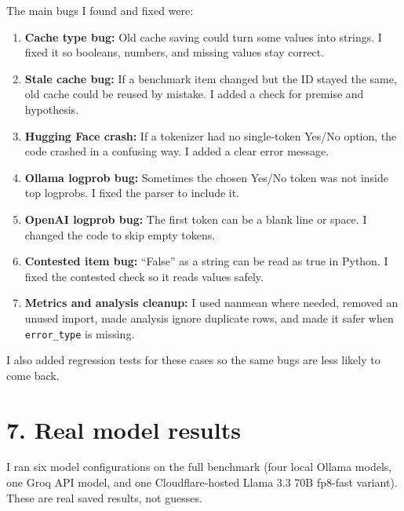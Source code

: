 \documentclass[11pt, a4paper]{article}
\begin{document}
The main bugs I found and fixed were:
\begin{enumerate}[leftmargin=*]
    \item \textbf{Cache type bug:} Old cache saving could turn some values into strings. I fixed it so booleans, numbers, and missing values stay correct.
    \item \textbf{Stale cache bug:} If a benchmark item changed but the ID stayed the same, old cache could be reused by mistake. I added a check for premise and hypothesis.
    \item \textbf{Hugging Face crash:} If a tokenizer had no single-token Yes/No option, the code crashed in a confusing way. I added a clear error message.
    \item \textbf{Ollama logprob bug:} Sometimes the chosen Yes/No token was not inside top logprobs. I fixed the parser to include it.
    \item \textbf{OpenAI logprob bug:} The first token can be a blank line or space. I changed the code to skip empty tokens.
    \item \textbf{Contested item bug:} ``False'' as a string can be read as true in Python. I fixed the contested check so it reads values safely.
    \item \textbf{Metrics and analysis cleanup:} I used nanmean where needed, removed an unused import, made analysis ignore duplicate rows, and made it safer when \texttt{error\_type} is missing.
\end{enumerate}
I also added regression tests for these cases so the same bugs are less likely to come back.

\FloatBarrier
{}
\section*{\color{bambergnavy} 7. Real model results}
I ran six model configurations on the full benchmark (four local Ollama models, one Groq API model, and one Cloudflare-hosted Llama 3.3 70B fp8-fast variant). These are real saved results, not guesses.
\end{document}
